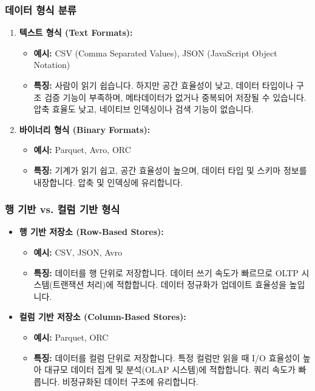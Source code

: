 \documentclass[11pt,a4paper]{article}
\begin{document}
\subsubsection{데이터 형식 분류}
\begin{enumerate}
    \item \textbf{텍스트 형식 (Text Formats):}
    \begin{itemize}
        \item \textbf{예시:} CSV (Comma Separated Values), JSON (JavaScript Object Notation)
        \item \textbf{특징:} 사람이 읽기 쉽습니다. 하지만 공간 효율성이 낮고, 데이터 타입이나 구조 검증 기능이 부족하며, 메타데이터가 없거나 중복되어 저장될 수 있습니다. 압축 효율도 낮고, 네이티브 인덱싱이나 검색 기능이 없습니다.
    \end{itemize}

    \item \textbf{바이너리 형식 (Binary Formats):}
    \begin{itemize}
        \item \textbf{예시:} Parquet, Avro, ORC
        \item \textbf{특징:} 기계가 읽기 쉽고, 공간 효율성이 높으며, 데이터 타입 및 스키마 정보를 내장합니다. 압축 및 인덱싱에 유리합니다.
    \end{itemize}
\end{enumerate}

\subsubsection{행 기반 vs. 컬럼 기반 형식}
\begin{itemize}
    \item \textbf{행 기반 저장소 (Row-Based Stores):}
    \begin{itemize}
        \item \textbf{예시:} CSV, JSON, Avro
        \item \textbf{특징:} 데이터를 행 단위로 저장합니다. 데이터 쓰기 속도가 빠르므로 OLTP 시스템(트랜잭션 처리)에 적합합니다. 데이터 정규화가 업데이트 효율성을 높입니다.
    \end{itemize}

    \item \textbf{컬럼 기반 저장소 (Column-Based Stores):}
    \begin{itemize}
        \item \textbf{예시:} Parquet, ORC
        \item \textbf{특징:} 데이터를 컬럼 단위로 저장합니다. 특정 컬럼만 읽을 때 I/O 효율성이 높아 대규모 데이터 집계 및 분석(OLAP 시스템)에 적합합니다. 쿼리 속도가 빠릅니다. 비정규화된 데이터 구조에 유리합니다.
    \end{itemize}
\end{itemize}
\end{document}
